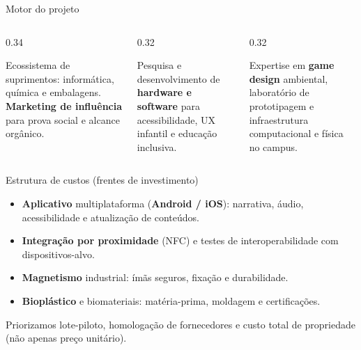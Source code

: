 \documentclass[aspectratio=169,11pt]{beamer}
\begin{document}
\begin{frame}{Motor do projeto}
  \begin{columns}[T,onlytextwidth]
    \begin{column}{0.34\textwidth}
      \begin{tcolorbox}[colback=VerdeEscuro!8,colframe=VerdeFloresta,arc=2mm,title=\textcolor{VerdeEscuro}{\textbf{Parcerias}}]
        \small Ecossistema de suprimentos: informática, química e embalagens. \textbf{Marketing de influência} para prova social e alcance orgânico.
      \end{tcolorbox}
    \end{column}
    \begin{column}{0.32\textwidth}
      \begin{tcolorbox}[colback=AmareloFauna!40,colframe=VerdeEscuro,arc=2mm,title=\textcolor{VerdeEscuro}{\textbf{Atividades-chave}}]
        \small Pesquisa e desenvolvimento de \textbf{hardware e software} para acessibilidade, UX infantil e educação inclusiva.
      \end{tcolorbox}
    \end{column}
    \begin{column}{0.32\textwidth}
      \begin{tcolorbox}[colback=VerdeCitrico!28,colframe=VerdeEscuro,arc=2mm,title=\textcolor{VerdeEscuro}{\textbf{Recursos}}]
        \small Expertise em \textbf{game design} ambiental, laboratório de prototipagem e infraestrutura computacional e física no campus.
      \end{tcolorbox}
    \end{column}
  \end{columns}
\end{frame}

\begin{frame}{Estrutura de custos (frentes de investimento)}
  \begin{itemize}\setlength\itemsep{0.45em}
    \item \textbf{Aplicativo} multiplataforma (\textbf{Android / iOS}): narrativa, áudio, acessibilidade e atualização de conteúdos.
    \item \textbf{Integração por proximidade} (NFC) e testes de interoperabilidade com dispositivos-alvo.
    \item \textbf{Magnetismo} industrial: ímãs seguros, fixação e durabilidade.
    \item \textbf{Bioplástico} e biomateriais: matéria-prima, moldagem e certificações.
  \end{itemize}
  \vspace{0.4em}
  \begin{fazzlehlcitrico}[title=Gestão]
    Priorizamos lote-piloto, homologação de fornecedores e custo total de propriedade (não apenas preço unitário).
  \end{fazzlehlcitrico}
\end{frame}
\end{document}
